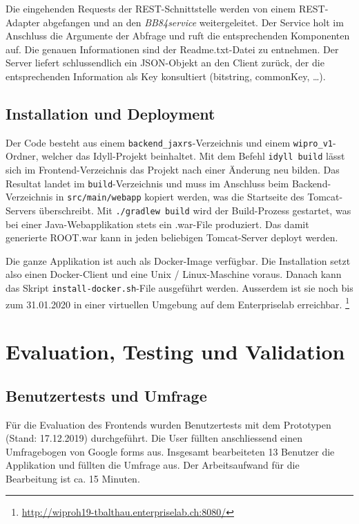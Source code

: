 \documentclass[a4paper,10.2pt,pdftex]{scrartcl}%
\begin{document}
Die eingehenden Requests der REST-Schnittstelle werden von einem REST-Adapter abgefangen und an den \emph{BB84service} weitergeleitet. Der Service holt im Anschluss die Argumente der Abfrage und ruft die entsprechenden Komponenten auf. Die genauen Informationen sind der Readme.txt-Datei zu entnehmen. Der Server liefert schlussendlich ein JSON-Objekt an den Client zurück, der die entsprechenden Information als Key konsultiert (bitstring, commonKey, \dots). 


\subsection{Installation und Deployment}
Der Code besteht aus einem \texttt{backend\_jaxrs}-Verzeichnis und einem \texttt{wipro\_v1}-Ordner, welcher das Idyll-Projekt beinhaltet. Mit dem Befehl \texttt{idyll build} lässt sich im Frontend-Verzeichnis das Projekt nach einer Änderung neu bilden. Das Resultat landet im \texttt{build}-Verzeichnis und muss im Anschluss beim Backend-Verzeichnis in \texttt{src/main/webapp} kopiert werden, was die Startseite des Tomcat-Servers überschreibt. Mit \texttt{./gradlew build} wird der Build-Prozess gestartet, was bei einer Java-Webapplikation stets ein .war-File produziert. Das damit generierte ROOT.war kann in jeden beliebigen Tomcat-Server deployt werden. 

Die ganze Applikation ist auch als Docker-Image verfügbar. Die Installation setzt also einen Docker-Client und eine Unix / Linux-Maschine voraus. Danach kann das Skript \texttt{install-docker.sh}-File ausgeführt werden.  Ausserdem ist sie noch bis zum 31.01.2020 in einer virtuellen Umgebung auf dem Enterpriselab erreichbar. \footnote{\url{http://wiproh19-tbalthau.enterpriselab.ch:8080/}}

\section{Evaluation, Testing und Validation}
\subsection{Benutzertests und Umfrage}
Für die Evaluation des Frontends wurden Benutzertests mit dem Prototypen (Stand: 17.12.2019) durchgeführt. Die User füllten anschliessend einen Umfragebogen von Google forms aus. Insgesamt bearbeiteten 13 Benutzer die Applikation und füllten die Umfrage aus. Der Arbeitsaufwand für die Bearbeitung ist ca. 15 Minuten.
\end{document}
